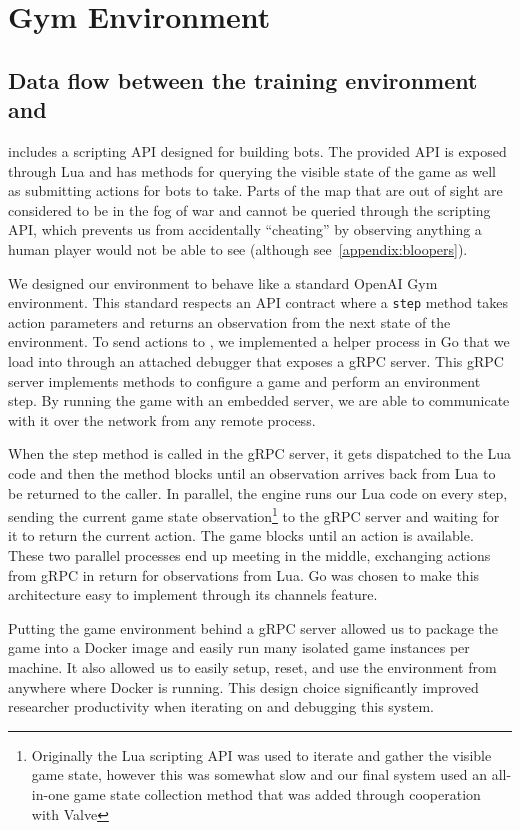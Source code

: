 \documentclass[ocean-paper.tex]{subfiles}
\begin{document}
\section{\dota Gym Environment}
\label{appendix:gym-ocean}
\subsection{Data flow between the training environment and \dota}

\dota includes a scripting API designed for building bots. The provided API is exposed through Lua and has methods for querying the visible state of the game as well as submitting actions for bots to take. Parts of the map that are out of sight are considered to be in the fog of war and cannot be queried through the scripting API, which prevents us from accidentally ``cheating'' by observing anything a human player would not be able to see (although see~\autoref{appendix:bloopers}).

We designed our \dota environment to behave like a standard OpenAI Gym environment\cite{brockman2016gym}. This standard respects an API contract where a {\tt step} method takes action parameters and returns an observation from the next state of the environment. To send actions to \dota, we implemented a helper process in Go that we load into \dota through an attached debugger that exposes a gRPC server. This gRPC server implements methods to configure a game and perform an environment step. By running the game with an embedded server, we are able to communicate with it over the network from any remote process.

When the step method is called in the gRPC server, it gets dispatched to the Lua code and then the method blocks until an observation arrives back from Lua to be returned to the caller. In parallel, the \dota engine runs our Lua code on every step, sending the current game state observation\footnote{Originally the Lua scripting API was used to iterate and gather the visible game state, however this was somewhat slow and our final system used an all-in-one game state collection method that was added through cooperation with Valve} to the gRPC server and waiting for it to return the current action. The game blocks until an action is available. These two parallel processes end up meeting in the middle, exchanging actions from gRPC in return for observations from Lua. Go was chosen to make this architecture easy to implement through its channels feature.

Putting the game environment behind a gRPC server allowed us to package the game into a Docker image and easily run many isolated game instances per machine. It also allowed us to easily setup, reset, and use the environment from anywhere where Docker is running. This design choice significantly improved researcher productivity when iterating on and debugging this system.
\end{document}

